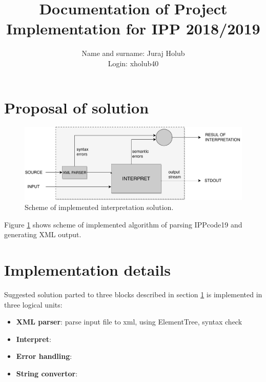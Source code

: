 \documentclass[a4paper, 10pt]{article}
\title{Documentation of Project Implementation for IPP 2018/2019 }
\author{Name and surname: Juraj Holub\\ Login: xholub40}
\date{}
\begin{document}
	\maketitle
	\thispagestyle{empty}

\section{Proposal of solution} \label{proposal}


\begin{figure}[H] 
	\centering
	\includegraphics[width=.8 \paperwidth]{interpret.pdf}
	\caption{Scheme of implemented interpretation solution.}
	\label{obr1}
\end{figure} 

Figure \ref{obr1} shows scheme of implemented algorithm of parsing IPPcode19 and generating XML output.

\section{Implementation details}
Suggested solution parted to three blocks described in section \ref{proposal} is implemented in three logical units:
\begin{itemize}
	\item \textbf{XML parser}: parse input file to xml, using ElementTree, syntax check
	\item \textbf{Interpret}: 
	\item \textbf{Error handling}: 
	\item \textbf{String convertor}:  
\end{itemize}
\end{document}
